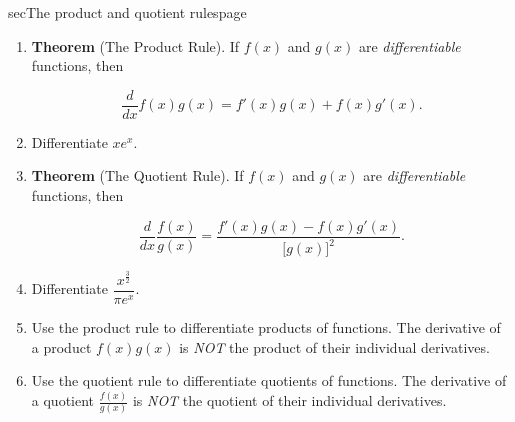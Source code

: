 \documentclass[../main]{subfiles}
\begin{document}
\begin{outline}{sec}{The product and quotient rules}{page} \label{act:products}
  \begin{enumerate}
    \item \textbf{Theorem} (The Product Rule). If \(f(x)\) and \(g(x)\) are \emph{differentiable} functions, then 
      \begin{mdframed}[style=simple]
        \[
          \frac{d}{dx} f(x)g(x) = f'(x) g(x) + f(x)g'(x).
        \]
      \end{mdframed}
        
    \item Differentiate \(x e^{x}\).

    \item \textbf{Theorem} (The Quotient Rule). If \(f(x)\) and \(g(x)\) are \emph{differentiable} functions, then 
      \begin{mdframed}[style=simple]
        \[
          \frac{d}{dx} \frac{f(x)}{g(x)} = \frac{f'(x) g(x) - f(x) g'(x)}{\big[g(x)\big]^{2}}.
        \]
      \end{mdframed}
        
    \item Differentiate \(\dfrac{x^{\frac{3}{2}}}{\pi e^{x}}\).
    \item {Use the product rule to differentiate products of functions. The derivative of a product \(f(x)g(x)\) is \emph{NOT} the product of their individual derivatives.}
    \item {Use the quotient rule to differentiate quotients of functions. The derivative of a quotient \(\frac{f(x)}{g(x)}\) is \emph{NOT} the quotient of their individual derivatives.}
\end{enumerate}
\end{outline}
\end{document}
